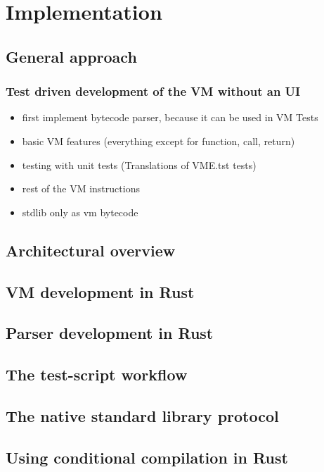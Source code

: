 \section{Implementation}

\subsection{General approach}
\subsubsection{Test driven development of the VM without an UI}
\begin{itemize}
  \item first implement bytecode parser, because it can be used in VM Tests
  \item basic VM features (everything except for function, call, return)
  \item testing with unit tests (Translations of VME.tst tests)
  \item rest of the VM instructions
  \item stdlib only as vm bytecode
\end{itemize}

\subsection{Architectural overview}

\subsection{VM development in Rust}
\subsection{Parser development in Rust}
\subsection{The test-script workflow}
\subsection{The native standard library protocol}
\subsection{Using conditional compilation in Rust}
